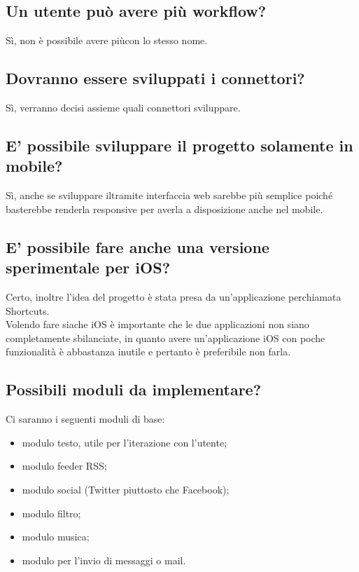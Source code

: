 \documentclass[a4paper,12pt]{article}
\begin{document}
	\subsection{Un utente può avere più workflow?}
	Sì, non è possibile avere piùcon lo stesso nome.

	\subsection{Dovranno essere sviluppati i connettori?}
	Sì, verranno decisi assieme quali connettori sviluppare.

	\subsection{E' possibile sviluppare il progetto solamente in mobile?}
	Sì, anche se sviluppare iltramite interfaccia web sarebbe  più semplice poiché basterebbe renderla responsive per averla a disposizione anche nel mobile.

	\subsection{E' possibile fare anche una versione sperimentale per iOS?}
	Certo, inoltre l'idea del progetto è stata presa da un'applicazione perchiamata Shortcuts. \\
	Volendo fare siache iOS è importante che le due applicazioni non siano completamente sbilanciate, in quanto avere un'applicazione iOS con poche funzionalità è abbastanza inutile e pertanto è preferibile non farla.

	\subsection{Possibili moduli da implementare?}
	Ci saranno i seguenti moduli di base:
	\begin{itemize}
		\item modulo testo, utile per l'iterazione con l'utente;
		\item modulo feeder RSS;
		\item modulo social (Twitter piuttosto che Facebook);
		\item modulo filtro;
		\item modulo musica;
		\item modulo per l'invio di messaggi o mail.
	\end{itemize}
\end{document}
